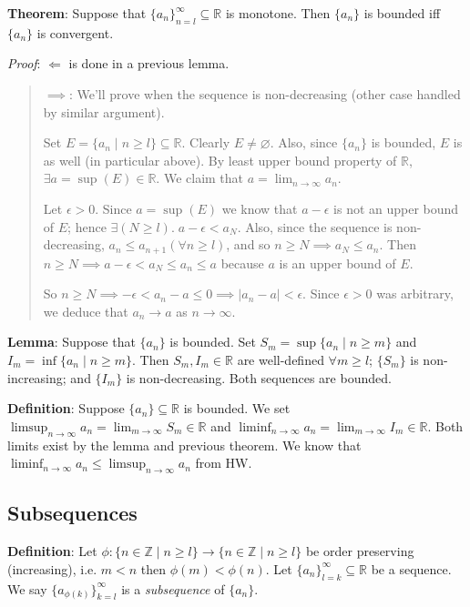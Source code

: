 \documentclass[11pt]{article}
\begin{document}
\textbf{Theorem}: Suppose that $\{a_n\}_{n=l}^\infty \subseteq \mathbb{R}$ is monotone. Then $\{a_n\}$ is bounded iff $\{a_n\}$ is convergent.

\emph{Proof}: $\Longleftarrow$ is done in a previous lemma.
\begin{quote}
$\implies$: We'll prove when the sequence is non-decreasing (other case handled by similar argument).

Set $E = \{a_n \mid n \geq l\} \subseteq \mathbb{R}$. Clearly $E \neq \varnothing$. Also, since $\{a_n\}$ is bounded, $E$ is as well (in particular above). By least upper bound property of $\mathbb{R}$, $\exists a = \sup(E) \in \mathbb{R}$. We claim that $a = \lim_{n \to \infty} a_n$.

Let $\epsilon > 0$. Since $a = \sup(E)$ we know that $a- \epsilon$ is not an upper bound of $E$; hence $\exists (N \geq l).\; a - \epsilon < a_N$. Also, since the sequence is non-decreasing, $a_n \leq a_{n+1} (\forall n \geq l)$, and so $n \geq N \implies a_N \leq a_n$. Then $n \geq N \implies a - \epsilon < a_N \leq a_n \leq a$ because $a$ is an upper bound of $E$.

So $n \geq N \implies -\epsilon < a_n - a \leq 0 \implies |a_n - a| < \epsilon$. Since $\epsilon > 0$ was arbitrary, we deduce that $a_n \to a$ as $n \to \infty$.
\end{quote}

\textbf{Lemma}: Suppose that $\{a_n\}$ is bounded. Set $S_m = \sup \{a_n \mid n \geq m\}$ and $I_m = \inf \{a_n \mid n \geq m\}$. Then $S_m, I_m \in \mathbb{R}$ are well-defined $\forall m \geq l$; $\{S_m\}$ is non-increasing; and $\{I_m\}$ is non-decreasing. Both sequences are bounded.

\textbf{Definition}: Suppose $\{a_n\} \subseteq \mathbb{R}$ is bounded. We set $\limsup_{n \to \infty} a_n = \lim_{m \to \infty} S_m \in \mathbb{R}$ and $\liminf_{n \to \infty} a_n = \lim_{m \to \infty} I_m \in \mathbb{R}$. Both limits exist by the lemma and previous theorem. We know that $\liminf_{n \to \infty} a_n \leq \limsup_{n \to \infty} a_n$ from HW.

\subsection{Subsequences}

\textbf{Definition}: Let $\phi: \{n \in \mathbb{Z} \mid n \geq l\} \to \{n \in \mathbb{Z}\mid n \geq l\}$ be order preserving (increasing), i.e. $m < n$ then $\phi(m) < \phi(n)$. Let $\{a_n\}_{l=k}^\infty \subseteq \mathbb{R}$ be a sequence. We say $\{a_{\phi(k)}\}_{k=l}^\infty$ is a \emph{subsequence} of $\{a_n\}$.
\end{document}
